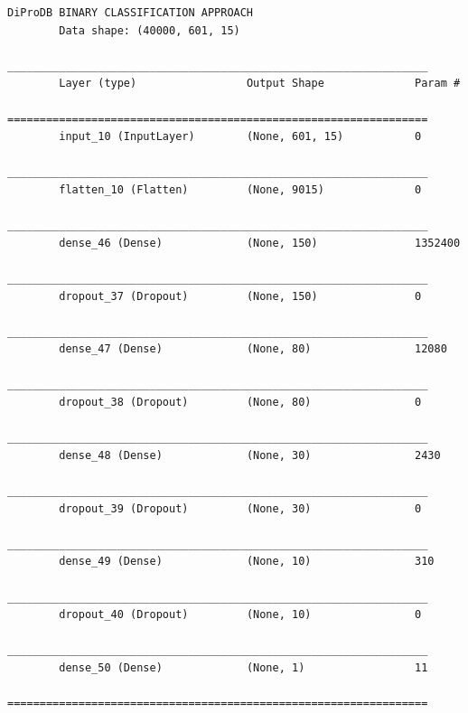 \documentclass[10pt]{beamer}
\begin{document}
\begin{frame}[fragile]
	\tiny
	\begin{lstlisting}[frame=none]
		DiProDB BINARY CLASSIFICATION APPROACH
		Data shape: (40000, 601, 15)
		_________________________________________________________________
		Layer (type)                 Output Shape              Param #   
		=================================================================
		input_10 (InputLayer)        (None, 601, 15)           0         
		_________________________________________________________________
		flatten_10 (Flatten)         (None, 9015)              0         
		_________________________________________________________________
		dense_46 (Dense)             (None, 150)               1352400   
		_________________________________________________________________
		dropout_37 (Dropout)         (None, 150)               0         
		_________________________________________________________________
		dense_47 (Dense)             (None, 80)                12080     
		_________________________________________________________________
		dropout_38 (Dropout)         (None, 80)                0         
		_________________________________________________________________
		dense_48 (Dense)             (None, 30)                2430      
		_________________________________________________________________
		dropout_39 (Dropout)         (None, 30)                0         
		_________________________________________________________________
		dense_49 (Dense)             (None, 10)                310       
		_________________________________________________________________
		dropout_40 (Dropout)         (None, 10)                0         
		_________________________________________________________________
		dense_50 (Dense)             (None, 1)                 11        
		=================================================================
		
	
	\end{lstlisting}
\end{frame}
\end{document}

